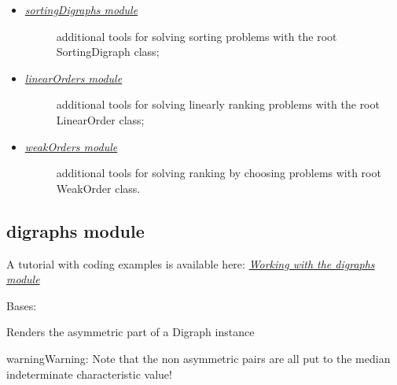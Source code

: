 \documentclass[letterpaper,10pt,english]{sphinxmanual}
\begin{document}
\begin{itemize}
\item {} \begin{description}
\item[{{\hyperref[techDoc:sortingdigraphs-label]{\emph{sortingDigraphs module}}}}] \leavevmode
additional tools for solving sorting problems with the root SortingDigraph class;

\end{description}

\item {} \begin{description}
\item[{{\hyperref[techDoc:linearorders-label]{\emph{linearOrders module}}}}] \leavevmode
additional tools for solving linearly ranking problems with the root LinearOrder class;

\end{description}

\item {} \begin{description}
\item[{{\hyperref[techDoc:weakorders-label]{\emph{weakOrders module}}}}] \leavevmode
additional tools for solving ranking by choosing problems with root WeakOrder class.

\end{description}

\end{itemize}


\subsection{digraphs module}
\label{techDoc:digraphs-label}\label{techDoc:digraphs-module}
A tutorial with coding examples is available here: {\hyperref[tutorial:digraphs-tutorial-label]{\emph{Working with the digraphs module}}}
\label{techDoc:module-digraphs}

\begin{fulllineitems}
\label{techDoc:digraphs.AsymmetricPartialDigraph}
Bases: {\hyperref[techDoc:digraphs.Digraph]{}}

Renders the asymmetric part of a Digraph instance

\begin{notice}{warning}{Warning:}
Note that the non asymmetric pairs are all put to the median indeterminate
characteristic value!
\end{notice}

\end{fulllineitems}
\end{document}
